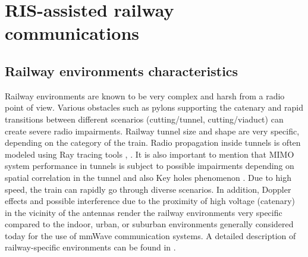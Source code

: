 \documentclass[conference]{IEEEtran}
\begin{document}

\section{RIS-assisted railway communications}
\label{sec:RIS_Railway}

\subsection{Railway environments characteristics}  %

Railway environments are known to be very complex and harsh from a radio point of view. Various obstacles such as pylons supporting the catenary and rapid transitions between different scenarios (cutting/tunnel, cutting/viaduct) can create severe radio impairments. Railway tunnel size and shape are very specific, depending on the category of the train. Radio propagation inside tunnels is often modeled using Ray tracing tools \cite{Qiu2021}, \cite{He2018}. It is also important to mention that MIMO system performance in tunnels is subject to possible impairments depending on spatial correlation in the tunnel and also Key holes phenomenon \cite{Berbineau2021}. Due to high speed, the train can rapidly go through diverse scenarios. In addition, Doppler effects and possible interference due to the proximity of high voltage (catenary) in the vicinity of the antennas render the railway environments very specific compared to the indoor, urban, or suburban environments generally considered today for the use of mmWave communication systems. A detailed description of railway-specific environments can be found in \cite{Berbineau2021}.
\end{document}
